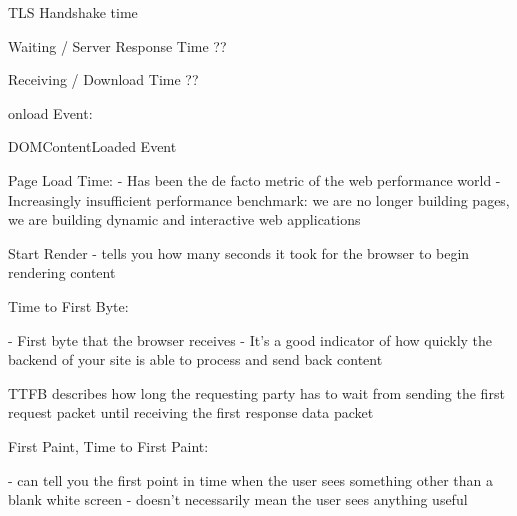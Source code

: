 TLS Handshake time %


Waiting / Server Response Time ?? %


Receiving / Download Time ?? %




onload Event: %



DOMContentLoaded Event %



Page Load Time: %
- Has been the de facto metric of the web performance world
- Increasingly insufficient performance benchmark: we are no longer building pages, we are building dynamic and interactive web applications



Start Render %
- tells you how many seconds it took for the browser to begin rendering content


Time to First Byte: %

- First byte that the browser receives
- It’s a good indicator of how quickly the backend of your site is able to process and send back content


TTFB describes how long the requesting party has to wait from sending the first request packet until receiving the first response data packet







First Paint, Time to First Paint: %


- can tell you the first point in time when the user sees something other than a blank white screen
- doesn’t necessarily mean the user sees anything useful




